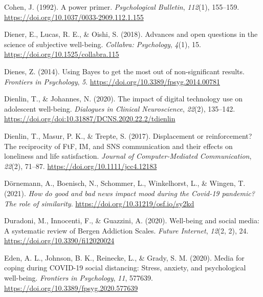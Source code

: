 \documentclass[
  man,mask]{apa7}
\newlength{\cslhangindent}
\newlength{\cslentryspacingunit} %
\newenvironment{CSLReferences}[2] %
 {%
  \setlength{\parindent}{0pt}
  \ifodd #1
  \let\oldpar\par
  \def\par{\hangindent=\cslhangindent\oldpar}
  \fi
  \setlength{\parskip}{#2\cslentryspacingunit}
 }%
 {}
\begin{document}
\begin{CSLReferences}{1}{0}
\leavevmode{}%
Cohen, J. (1992). A power primer. \emph{Psychological Bulletin}, \emph{112}(1), 155--159. \url{https://doi.org/10.1037/0033-2909.112.1.155}

\leavevmode{}%
Diener, E., Lucas, R. E., \& Oishi, S. (2018). Advances and open questions in the science of subjective well-being. \emph{Collabra: Psychology}, \emph{4}(1), 15. \url{https://doi.org/10.1525/collabra.115}

\leavevmode{}%
Dienes, Z. (2014). Using {Bayes} to get the most out of non-significant results. \emph{Frontiers in Psychology}, \emph{5}. \url{https://doi.org/10.3389/fpsyg.2014.00781}

\leavevmode{}%
Dienlin, T., \& Johannes, N. (2020). The impact of digital technology use on adolescent well-being. \emph{Dialogues in Clinical Neuroscience}, \emph{22}(2), 135--142. \url{https://doi.org/doi:10.31887/DCNS.2020.22.2/tdienlin}

\leavevmode{}%
Dienlin, T., Masur, P. K., \& Trepte, S. (2017). Displacement or reinforcement? {The} reciprocity of {FtF}, {IM}, and {SNS} communication and their effects on loneliness and life satisfaction. \emph{Journal of Computer-Mediated Communication}, \emph{22}(2), 71--87. \url{https://doi.org/10.1111/jcc4.12183}

\leavevmode{}%
Dörnemann, A., Boenisch, N., Schommer, L., Winkelhorst, L., \& Wingen, T. (2021). \emph{How do good and bad news impact mood during the {Covid-19} pandemic? {The} role of similarity}. \url{https://doi.org/10.31219/osf.io/sy2kd}

\leavevmode{}%
Duradoni, M., Innocenti, F., \& Guazzini, A. (2020). Well-being and social media: {A} systematic review of {Bergen Addiction Scales}. \emph{Future Internet}, \emph{12}(2, 2), 24. \url{https://doi.org/10.3390/fi12020024}

\leavevmode{}%
Eden, A. L., Johnson, B. K., Reinecke, L., \& Grady, S. M. (2020). Media for coping during {COVID-19} social distancing: {Stress}, anxiety, and psychological well-being. \emph{Frontiers in Psychology}, \emph{11}, 577639. \url{https://doi.org/10.3389/fpsyg.2020.577639}


\end{CSLReferences}
\end{document}
